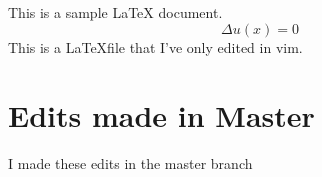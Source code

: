\documentclass[11pt,letterpaper]{article}
\begin{document}
	This is a sample LaTeX document.
	\begin{equation} \Delta u(x)=0\end{equation}
	This is a \LaTeX file that I've only edited in vim.	
	
	\section{Edits made in Master}
	I made these edits in the master branch
\end{document}
